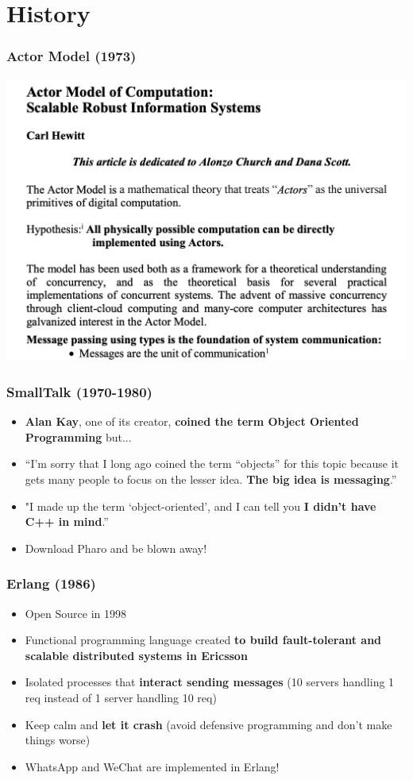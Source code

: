 \documentclass{beamer}
\begin{document}
\section{History}

\begin{frame}
\frametitle{Actor Model (1973)}
\includegraphics[scale=0.5]{images/actor_model_paper.png}
\end{frame}

\begin{frame}
\frametitle{SmallTalk (1970-1980)}
   \begin{itemize}
    \item<1->  \textbf{Alan Kay}, one of its creator, \textbf{coined the term Object Oriented Programming }but...   
    \item<2->  “I’m sorry that I long ago coined the term “objects” for this topic because it gets many people to focus on the lesser idea. \textbf{The big idea is messaging}.”
    \item<3-> "I made up the term ‘object-oriented’, and I can tell you \textbf{I didn’t have C++ in mind}.”
     \item<4-> Download Pharo and be blown away!
   \end{itemize}      
\end{frame}

\begin{frame}
\frametitle{Erlang (1986)}
   \begin{itemize}
    \item<1->  Open Source in 1998      
    \item<2->  Functional programming language created \textbf{to build fault-tolerant and scalable distributed systems in Ericsson}
    \item<3->  Isolated processes that \textbf{interact sending messages} (10 servers handling 1 req instead of 1 server handling 10 req)
    \item<4->  Keep calm and \textbf{let it crash} (avoid defensive programming and don't make things worse)
    \item<5-> WhatsApp  and WeChat are implemented in Erlang!
  \end{itemize}      
\begin{figure}
\end{figure}
\end{frame} 
\end{document}

